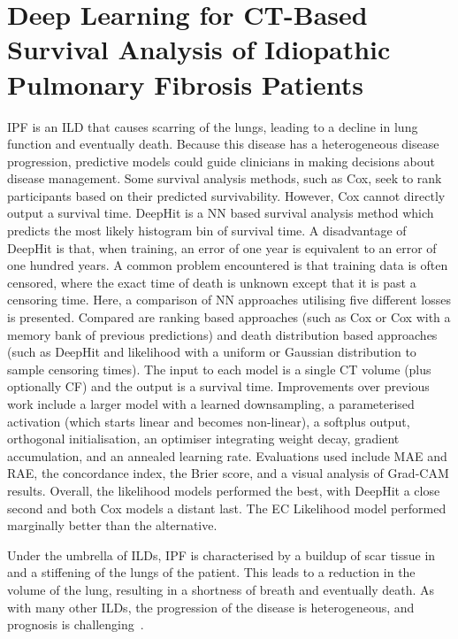 \chapter{Deep Learning for CT-Based Survival Analysis of Idiopathic Pulmonary Fibrosis Patients} \label{sec:deep_learning_for_ct_based_survival_analysis_of_idiopathic_pulmonary_fibrosis_patients_appendix}
    \newpage

        \gls{IPF} is an \gls{ILD} that causes scarring of the lungs, leading to a decline in lung function and eventually death. Because this disease has a heterogeneous disease progression, predictive models could guide clinicians in making decisions about disease management. Some survival analysis methods, such as Cox, seek to rank participants based on their predicted survivability. However, Cox cannot directly output a survival time. DeepHit is a \gls{NN} based survival analysis method which predicts the most likely histogram bin of survival time. A disadvantage of DeepHit is that, when training, an error of one year is equivalent to an error of one hundred years. A common problem encountered is that training data is often censored, where the exact time of death is unknown except that it is past a censoring time. Here, a comparison of \gls{NN} approaches utilising five different losses is presented. Compared are ranking based approaches (such as Cox or Cox with a memory bank of previous predictions) and death distribution based approaches (such as DeepHit and likelihood with a uniform or Gaussian distribution to sample censoring times). The input to each model is a single \gls{CT} volume (plus optionally \gls{CF}) and the output is a survival time. Improvements over previous work include a larger model with a learned downsampling, a parameterised activation (which starts linear and becomes non-linear), a softplus output, orthogonal initialisation, an optimiser integrating weight decay, gradient accumulation, and an annealed learning rate. Evaluations used include \gls{MAE} and \gls{RAE}, the concordance index, the Brier score, and a visual analysis of \gls{Grad-CAM} results. Overall, the likelihood models performed the best, with DeepHit a close second and both Cox models a distant last. The \gls{EC} Likelihood model performed marginally better than the alternative.

        Under the umbrella of \glspl{ILD}, \gls{IPF} is  characterised by a buildup of scar tissue in and a stiffening of the lungs of the patient. This leads to a reduction in the volume of the lung, resulting in a shortness of breath and eventually death. As with many other \glspl{ILD}, the progression of the disease is heterogeneous, and prognosis is challenging~\parencite{King2011IdiopathicFibrosis}.
        
